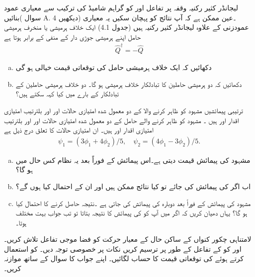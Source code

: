 لیجانڈر کثیر رکنیہ  وقفہ   پر تفاعل  اور   کو گراہم شامیڈ کی ترکیب سے معیاری عمود بنائیں( سوال A. 4 دیکھیں) ۔عین ممکن ہے کہ آپ نتائج کو پہچان سکیں یہ معیاری عمودزنی کے علاوہ لیجانڈر کثیر رکنیہ ہیں (جدول 4.1)
ایک خلاف ہرمیشی یا منخرف ہرمیشی حامل اپنے ہرمیشی جوڑی دار کے منفی کے برابر ہوتا ہے 
         \begin{align}
         \hat{Q}^{\dagger} = -\hat{Q}
         \end{align}
\begin{enumerate}[a.]
\item  دکھائیں کہ ایک خلاف ہرمیشی حامل کی   توقعاتی قیمت خیالی ہو گی
\item دکھائیں کہ دو ہرمیشی حاملین کا تبادلکار خلاف ہرمیشی ہو گا۔ دو خلاف ہرمیشی حاملین کے تبادلکار کے بارے میں کیا کہہ سکتے ہیں؟ 
\end{enumerate}
ترتیبی پیمائشیں مشہود  کو ظاہر کرنے والا  کے دو معمول شدہ امتیازی حالات اور اور بلترتیب امتیازی اقدار اور ہیں ۔ مشہود  کو ظاہر کرنے والے حامل  کے دو معمول شدہ امتیازی حالات اور  اور بلترتیب امتیازی اقدار اور  ہیں۔ ان امتیازی حالات کا تعلق درج ذیل ہے 
\begin{align*}
\psi_{1} = ( 3\phi_{1} + 4\phi_{2})/5, \quad \psi_{2} = ( 4\phi_{1} - 3\phi_{2})/5. 
\end{align*}
\begin{enumerate}[a.]
\item  مشہود  کی پیمائش  قیمت دیتی ہے۔اس پیمائش کے فوراً بعد یہ نظام کس حال میں ہو گا؟ 
\item اب اگر  کی پیمائش کی جائے تو کیا نتائج ممکن ہیں اور ان کے احتمال کیا ہوں گے؟ 
\item مشہود  کی پیمائش کے فوراً بعد دوبارہ  کی پیمائش کی جاتی ہے ۔نتیجہ  حاصل کرنے کا احتمال کیا ہو گا؟ یہاں دھیان کریں کہ اگر میں آپ کو  کی پیمائش کا نتیجہ بتاتا تو تب جواب بہت مختلف ہوتا۔ 
\end{enumerate}
لامتناہی چکور کنواں کے  ساکن حال کے معیار حرکت کو فضا موجی تفاعل  تلاش کریں۔ اور  کو  کے تفاعل کے طور پر ترسیم کریں نکات   پر خصوصی توجہ دیں۔  کو استعمال کرتے ہوئے  کی توقعاتی قیمت کا حساب لگائیں۔ اپنے جواب کا سوال  کے ساتھ موازنہ کریں۔
